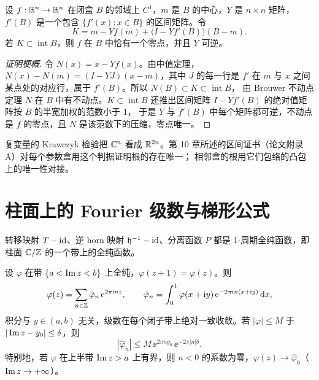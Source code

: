 \begin{proposition}\label{appA:prop:krawczyk}
设 $f:\mathbb{R}^n\to\mathbb{R}^n$ 在闭盒 $B$ 的邻域上 $C^1$，$m$ 是 $B$ 的中心，$Y$ 是 $n\times n$ 矩阵，$f'(B)$ 是一个包含 $\{f'(x):x\in B\}$ 的区间矩阵。令
\[
  K=m-Yf(m)+\bigl(I-Yf'(B)\bigr)(B-m) .
\]
若 $K\subset\operatorname{int}B$，则 $f$ 在 $B$ 中恰有一个零点，并且 $Y$ 可逆。
\end{proposition}

\begin{proof}[证明梗概]
令 $N(x)=x-Yf(x)$。由中值定理，$N(x)-N(m)=(I-YJ)(x-m)$，其中 $J$ 的每一行是 $f'$ 在 $m$ 与 $x$ 之间某点处的对应行，属于 $f'(B)$。所以 $N(B)\subset K\subset\operatorname{int}B$，
由 Brouwer 不动点定理 $N$ 在 $B$ 中有不动点。$K\subset\operatorname{int}B$ 还推出区间矩阵 $I-Yf'(B)$ 的绝对值矩阵按 $B$ 的半宽加权的范数小于 $1$，
于是 $Y$ 与 $f'(B)$ 中每个矩阵都可逆，不动点是 $f$ 的零点，且 $N$ 是该范数下的压缩，零点唯一。
\end{proof}

复变量的 Krawczyk 检验把 $\mathbb{C}^n$ 看成 $\mathbb{R}^{2n}$。第 10 章所述的区间证书（论文附录 A）对每个参数盒用这个判据证明根的存在唯一；
相邻盒的根用它们包络的凸包上的唯一性对接。

\section{柱面上的 Fourier 级数与梯形公式}\label{appA:sec:fourier}

转移映射 $T-\mathrm{id}$、逆 horn 映射 $\mathfrak h^{-1}-\mathrm{id}$、分离函数 $P$ 都是 1-周期全纯函数，即柱面 $\mathbb{C}/\mathbb{Z}$ 的一个带上的全纯函数。

\begin{proposition}[Fourier 级数]\label{appA:prop:fourier}
设 $\varphi$ 在带 $\{a<\operatorname{Im} z<b\}$ 上全纯，$\varphi(z+1)=\varphi(z)$。则
\[
  \varphi(z)=\sum_{n\in\mathbb{Z}}\hat\varphi_n\,\mathrm{e}^{2\pi\mathrm{i} nz},\qquad \hat\varphi_n=\int_0^1\varphi(x+\mathrm{i} y)\,\mathrm{e}^{-2\pi\mathrm{i} n(x+\mathrm{i} y)}\,\mathrm{d} x ,
\]
积分与 $y\in(a,b)$ 无关，级数在每个闭子带上绝对一致收敛。若 $|\varphi|\le M$ 于 $|\operatorname{Im} z-y_0|\le\delta$，则
\begin{equation}\label{appA:eq:fourier-bound}
  |\hat\varphi_n|\le M\,\ee^{2\pi ny_0}\,\ee^{-2\pi|n|\delta} .
\end{equation}
特别地，若 $\varphi$ 在上半带 $\operatorname{Im} z>a$ 上有界，则 $n<0$ 的系数为零，$\varphi(z)\to\hat\varphi_0$（$\operatorname{Im} z\to+\infty$）。
\end{proposition}

